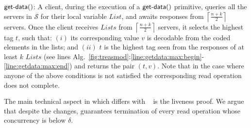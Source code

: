 $\dagetdata{c}$:	A  client, during the execution of a  $\dagetdata{c}$ primitive, queries all the servers in $\mathcal{S}$ for their  local variable $List$, and awaits responses from $\left\lceil \frac{n+k}{2} \right\rceil$ servers. Once the client receives $Lists$ from $\left\lceil \frac{n+k}{2} \right\rceil$ servers,  it selects the highest  tag $t$, such that: $(i)$ its corresponding value $v$ is decodable from the coded elements in the lists; and $(ii)$ $t$ is the highest tag seen from the responses of at least $k$ $Lists$ 
(see lines Alg.~\ref{fig:treasmod}:\ref{line:getdata:max:begin}-\ref{line:getdata:max:end}) and returns the pair $(t, v)$. 
Note that in the case where anyone of the above conditions is not satisfied the corresponding read operation does not complete.

The main technical aspect in which {\treasmod} differs with ~\treas{} is the liveness proof. We argue that despite the changes, {\treasmod} guarantees termination of every read operation whose concurrency is below $\delta$.

